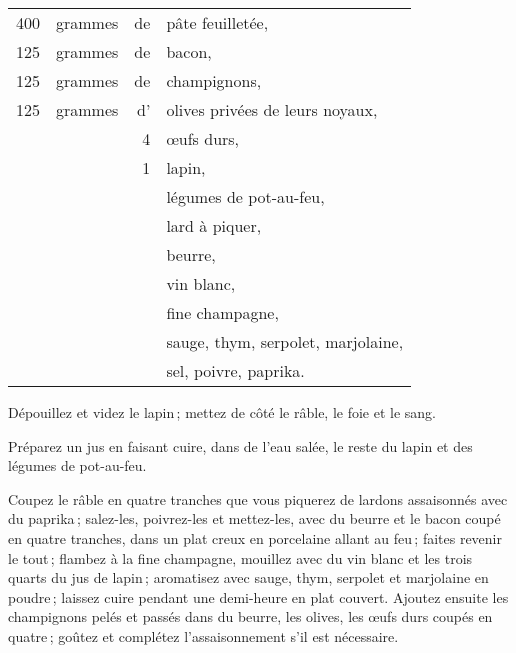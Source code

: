 \footnotesize
\begin{longtable}{rrrp{16em}}
    400 & grammes & de & pâte feuilletée,                                                                 \\
    125 & grammes & de & bacon,                                                                           \\
    125 & grammes & de & champignons,                                                                     \\
    125 & grammes & d' & olives privées de leurs noyaux,                                                  \\
        &         &  4 & œufs durs,                                                                       \\
        &         &  1 & lapin,                                                                           \\
        &         &    & légumes de pot-au-feu,                                                           \\
        &         &    & lard à piquer,                                                                   \\
        &         &    & beurre,                                                                          \\
        &         &    & vin blanc,                                                                       \\
        &         &    & fine champagne,                                                                  \\
        &         &    & sauge, thym, serpolet, marjolaine,                                               \\
        &         &    & sel, poivre, paprika.                                                            \\
\end{longtable}
\normalsize

Dépouillez et videz le lapin ; mettez de côté le râble, le foie et le sang.

Préparez un jus en faisant cuire, dans de l'eau salée, le reste du lapin et des
légumes de pot-au-feu.

Coupez le râble en quatre tranches que vous piquerez de lardons assaisonnés
avec du paprika ; salez-les, poivrez-les et mettez-les, avec du beurre et le
bacon coupé en quatre tranches, dans un plat creux en porcelaine allant au
feu ; faites revenir le tout ; flambez à la fine champagne, mouillez avec du
vin blanc et les trois quarts du jus de lapin ; aromatisez avec sauge, thym,
serpolet et marjolaine en poudre ; laissez cuire pendant une demi-heure en plat
couvert. Ajoutez ensuite les champignons pelés et passés dans du beurre, les
olives, les œufs durs coupés en quatre ; goûtez et complétez l'assaisonnement
s'il est nécessaire.

